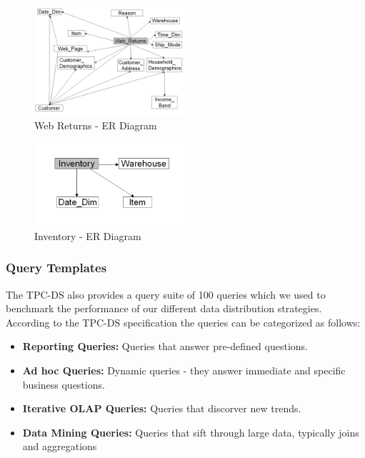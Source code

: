 \documentclass[conference]{IEEEtran}
\begin{document}
\begin{figure}[h]
	\centering
	\includegraphics[width=0.5\textwidth]{images/ER_Diagrams/Web Returns - ER Diagram.png}
	\caption{Web Returns - ER Diagram}
	\label{fig:web_returns_er_diagram}
\end{figure}

\begin{figure}[h]
	\centering
	\includegraphics[width=0.5\textwidth]{images/ER_Diagrams/Inventory - ER Diagram.png}
	\caption{Inventory - ER Diagram}
	\label{fig:inventory_er_diagram}
\end{figure}

\subsubsection{Query Templates}

The TPC-DS also provides a query suite of 100 queries which we used to benchmark the performance of our different data distribution strategies. According to the TPC-DS specification \cite{b10} the queries can be categorized as follows:

\begin{itemize}
	\item \textbf{Reporting Queries:} Queries that answer pre-defined questions.
	\item \textbf{Ad hoc Queries:}  Dynamic queries - they answer immediate and specific business questions.
	\item \textbf{Iterative OLAP Queries:}  Queries that discorver new trends.
	\item \textbf{Data Mining Queries:}  Queries that sift through large data, typically joins and aggregations
\end{itemize}
\end{document}

